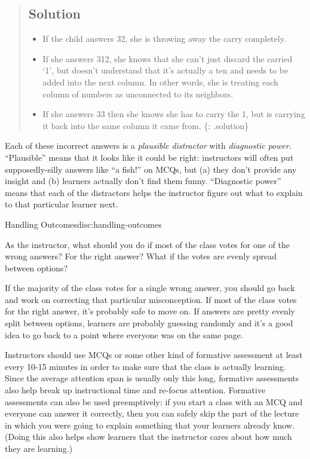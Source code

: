 \begin{quote}
\subsection{Solution}\label{solution}

\begin{itemize}
\itemsep1pt\parskip0pt
\item
  If the child answers 32, she is throwing away the carry completely.
\item
  If she answers 312, she knows that she can't just discard the carried
  `1', but doesn't understand that it's actually a ten and needs to be
  added into the next column. In other words, she is treating each
  column of numbers as unconnected to its neighbors.
\item
  If she answers 33 then she knows she has to carry the 1, but is
  carrying it back into the same column it came from. \{: .solution\}
\end{itemize}
\end{quote}

Each of these incorrect answers is a \emph{plausible distractor} with
\emph{diagnostic power}. ``Plausible'' means that it looks like it could
be right: instructors will often put supposedly-silly answers like ``a
fish!'' on MCQs, but (a) they don't provide any insight and (b) learners
actually don't find them funny. ``Diagnostic power'' means that each of
the distractors helps the instructor figure out what to explain to that
particular learner next.

\begin{discussion}{Handling Outcomes}{disc:handling-outcomes}

As the instructor, what should you do if most of the class votes for one
of the wrong answers? For the right answer? What if the votes are evenly
spread between options?
\end{discussion}

If the majority of the class votes for a single wrong answer, you should
go back and work on correcting that particular misconception. If most of
the class votes for the right answer, it's probably safe to move on. If
answers are pretty evenly split between options, learners are probably
guessing randomly and it's a good idea to go back to a point where
everyone was on the same page.

Instructors should use MCQs or some other kind of formative assessment
at least every 10-15 minutes in order to make sure that the class is
actually learning. Since the average attention span is usually only this
long, formative assessments also help break up instructional time and
re-focus attention. Formative assessments can also be used preemptively:
if you start a class with an MCQ and everyone can answer it correctly,
then you can safely skip the part of the lecture in which you were going
to explain something that your learners already know. (Doing this also
helps show learners that the instructor cares about how much they are
learning.)

